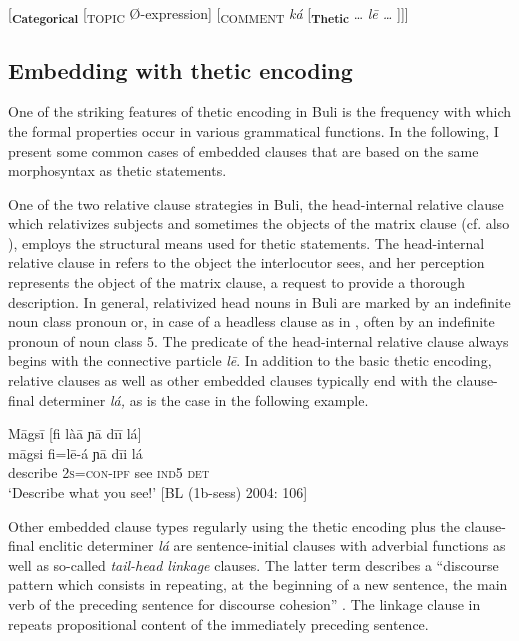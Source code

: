\documentclass[output=paper]{langsci/langscibook}
\begin{document}
\ea\label{ex:schwarz:27} {}
[\textbf{\textsubscript{Categorical}}\textsubscript{} [\textsubscript{TOPIC} Ø-expression]\textsubscript{} [\textsubscript{COMMENT}\textit{ ká} [\textbf{\textsubscript{Thetic}} … \textit{l\={e} …} ]]]
\z

\subsection{Embedding with thetic encoding}\label{sec:schwarz:3.5}

One of the striking features of thetic encoding in Buli is the frequency with which the formal properties occur in various grammatical functions. In the following, I present some common cases of embedded clauses that are based on the same morphosyntax as thetic statements.

One of the two relative clause strategies in Buli, the head-internal relative clause which relativizes subjects and sometimes the objects of the matrix clause (cf. also \citealt{Hiraiwa2003}), employs the structural means used for thetic statements. The head-internal relative clause in  refers to the object the interlocutor sees, and her perception represents the object of the matrix clause, a request to provide a thorough description. In general, relativized head nouns in Buli are marked by an indefinite noun class pronoun or, in case of a headless clause as in , often by an indefinite pronoun of noun class 5. The predicate of the head-internal relative clause always begins with the connective particle \textit{l\={e}}. In addition to the basic thetic encoding, relative clauses as well as other embedded clauses typically end with the clause-final determiner \textit{lá,} as is the case in the following example.

\ea\label{ex:schwarz:28}
\glll   M\={a}gs\={i}    \textup{[}{fi là\={a}}     ɲ\={a}  d\={i}\={i}   lá\textup{]}\\
    \textup{m\={a}gsi}    fi=l\={e}-á     ɲ\={a}  {d\={i}i} {lá}\\
       describe    2\textsc{s}=\textsc{con}-\textsc{ipf}   see     \textsc{ind}5 \textsc{det}\\
\glt ‘Describe what you see!’ [BL (1b-sess) 2004: 106]
\z

Other embedded clause types regularly using the thetic encoding plus the clause-final enclitic determiner \textit{lá} are sentence-initial clauses with adverbial functions as well as so-called \textit{tail-head linkage} clauses. The latter term describes a “discourse pattern which consists in repeating, at the beginning of a new sentence, the main verb of the preceding sentence for discourse cohesion” \citep[109]{Guillaume2011}. The linkage clause in  repeats propositional content of the immediately preceding sentence. 
\end{document}
